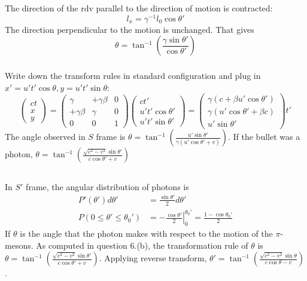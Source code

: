 \documentclass[12pt]{article}
\begin{document}
            \subsubsection{} The direction of the rdv parallel to the direction of motion is contracted:\[l_x = \gamma^{-1} l_{0}\cos \theta'\]
            The direction perpendicular to the motion is unchanged. That gives
            \[\theta = \tan^{-1} \left(\frac{\gamma\sin \theta'}{ \cos\theta'}\right)\]
            \subsubsection{} Write down the transform rules in standard configuration and plug in $x'=u't'\cos\theta,y=u't'\sin\theta $:
            \[
                \begin{pmatrix}
                    ct\\
                    x\\
                    y
                \end{pmatrix} =
                \begin{pmatrix}
                    \gamma & + \gamma \beta&0\\
                    +\gamma\beta & \gamma&0\\
                    0&0&1
                \end{pmatrix}
                \begin{pmatrix}
                    ct'\\
                    u't'\cos \theta'\\
                    u't'\sin\theta'
                \end{pmatrix} =
                \begin{pmatrix}
                    \gamma (c + \beta u'\cos \theta')\\
                    \gamma (u'\cos \theta' + \beta c) \\
                    u'\sin \theta'
                \end{pmatrix}t'
            \]
            The angle observed in $S$ frame is \(\theta =\tan^{-1}\left(\frac{u'\sin\theta'}{ \gamma(u'\cos \theta' + v)}\right)\). If the bullet was a photon, \(\theta =\tan^{-1}\left(\frac{\sqrt{c^2 - v^2}\sin\theta'}{c\cos \theta' + v}\right)\)
        \subsection{} In $S'$ frame, the angular distribution of photons is \begin{align*}
            P'(\theta')d\theta' &=  \frac{\sin \theta'}{2}d\theta'\\
            P(0\leq\theta' \leq \theta_0') &= \left. -\frac{\cos \theta'}{2}\right|_{0}^{\theta_0'} = \frac{1 -\cos \theta_0' }{2}
        \end{align*}
        If $\theta$ is the angle that the photon makes with respect to the motion of the $\pi$-mesons. As computed in question 6.(b), the transformation rule of $\theta$ is  \(\theta =\tan^{-1}\left(\frac{\sqrt{c^2 - v^2}\sin\theta'}{c\cos \theta' + v}\right)\). Applying reverse transform, \(\theta' =\tan^{-1}\left(\frac{\sqrt{c^2 - v^2}\sin\theta}{c\cos \theta - v}\right)\).
\end{document}
